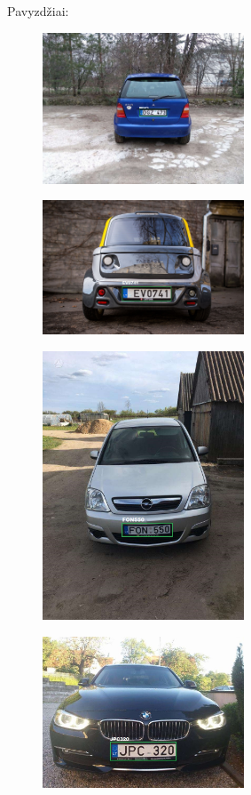 \documentclass{VUMIFInfBakalaurinis}
\begin{document}
Pavyzdžiai:
\newline
\begin{subfigure}{\linewidth}
  \centering
  \includegraphics[width=6cm]{cars/dgz473.jpg}
  \label{DGZ473}
\end{subfigure}
\begin{subfigure}{\linewidth}
  \centering
  \includegraphics[width=6cm]{cars/ev0741.jpg}
  \label{EV0741}
\end{subfigure}
\begin{subfigure}{\linewidth}
  \centering
  \includegraphics[width=6cm]{cars/fon550.jpg}
  \label{FON550}
\end{subfigure}
\begin{subfigure}{\linewidth}
  \centering
  \includegraphics[width=6cm]{cars/jpc320.jpg}
  \label{JPC320}
\end{subfigure}
\end{document}
